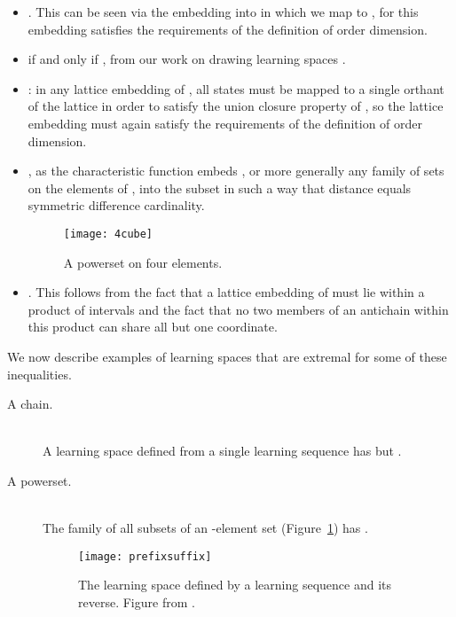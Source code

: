 \documentclass[11pt]{llncs}
\begin{document}
{\begin{itemize}
\item  \citep{KorLovSch-91}. This can be seen via the embedding into  in which we map  to , for this embedding satisfies the requirements of the definition of order dimension.

\item  if and only if , from our work on drawing learning spaces \citep{eppst06}.

\item : in any lattice embedding of , all states must be mapped to a single orthant of the lattice in order to satisfy the union closure property of , so the lattice embedding must again satisfy the requirements of the definition of order dimension.

\item , as the characteristic function embeds , or more generally any family of sets on the elements of , into the subset  in such a way that  distance equals symmetric difference cardinality.

\begin{figure}[t]
\centering\texttt{[image: 4cube]}
\caption{A powerset on four elements.}
\label{fig:4cube}
\end{figure}

\item .
This follows from the fact that a lattice embedding of  must lie within a product of intervals  and the fact that no two members of an antichain within this product can share all but one coordinate.
\end{itemize}

\noindent
We now describe examples of learning spaces that are extremal for some of these inequalities.

\begin{description}
\item[A chain.] \hfill\\
A learning space defined from a single learning sequence has
 but
.

\item[A powerset.] \hfill\\
The family of all subsets of an -element set (Figure~\ref{fig:4cube}) has .

\begin{figure}[t]
\centering\texttt{[image: prefixsuffix]}
\caption{The learning space defined by a learning sequence and its reverse. Figure from \citet{eppst06}.}
\label{fig:prefixsuffix}
\end{figure}


\end{description}}
\end{document}
